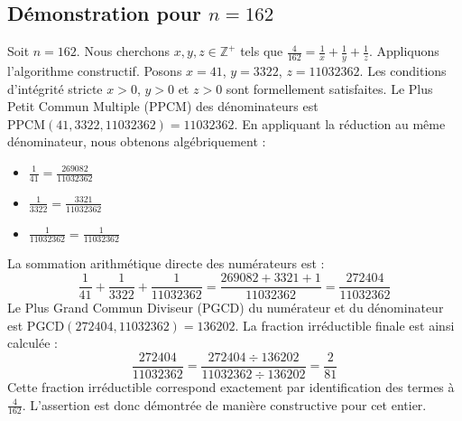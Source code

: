 \documentclass[11pt,a4paper]{article}
\begin{document}
\subsection{Démonstration pour $n = 162$}
Soit $n = 162$. Nous cherchons $x, y, z \in \mathbb{Z}^{+}$ tels que $\frac{4}{162} = \frac{1}{x} + \frac{1}{y} + \frac{1}{z}$.
Appliquons l'algorithme constructif. Posons $x = 41$, $y = 3322$, $z = 11032362$.
Les conditions d'intégrité stricte $x > 0$, $y > 0$ et $z > 0$ sont formellement satisfaites.
Le Plus Petit Commun Multiple (PPCM) des dénominateurs est $\text{PPCM}(41, 3322, 11032362) = 11032362$.
En appliquant la réduction au même dénominateur, nous obtenons algébriquement :
\begin{itemize}
    \item $\frac{1}{41} = \frac{269082}{11032362}$
    \item $\frac{1}{3322} = \frac{3321}{11032362}$
    \item $\frac{1}{11032362} = \frac{1}{11032362}$
\end{itemize}
La sommation arithmétique directe des numérateurs est :
$$ \frac{1}{41} + \frac{1}{3322} + \frac{1}{11032362} = \frac{269082 + 3321 + 1}{11032362} = \frac{272404}{11032362} $$
Le Plus Grand Commun Diviseur (PGCD) du numérateur et du dénominateur est $\text{PGCD}(272404, 11032362) = 136202$.
La fraction irréductible finale est ainsi calculée :
$$ \frac{272404}{11032362} = \frac{272404 \div 136202}{11032362 \div 136202} = \frac{2}{81} $$
Cette fraction irréductible correspond exactement par identification des termes à $\frac{4}{162}$. L'assertion est donc démontrée de manière constructive pour cet entier.
\end{document}
